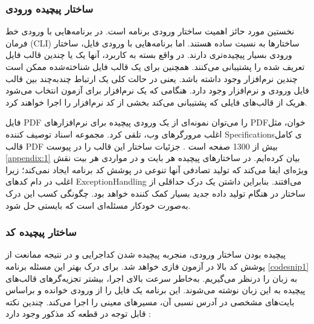 \subsubsection{ساختار پیچیده ورودی}
نخستین مورد حائز اهمیت ساختار ورودی برنامه است. در برنامه‌هایی با ورودی خط فرمان (\gls{CLI}) ساختارها به نسبت ساده هستند. اما برنامه‌هایی با ورودی فایل، ساختار ورودی بسیار پیچیده‌تری دارند. در واقع بسته به کاربرد، آنها یک یا چندین قالب فایل تعریف شده را پشتیبانی می‌کنند. همچنین برای یک قالب فایل شناخته‌شده ممکن است چندین نرم‌افزار وجود داشته‌ باشد. یعنی در حالت کلی یک ارتباط چند‌به‌چند بین قالب فایل ورودی و نرم‌افزار
وجود دارد. هنگامی که یک نرم‌افزار برای آزمون انتخاب می‌شود هریک از قالب‌های فایلی که پشتیبانی ‌می‌کند بخشی از کد نرم‌افزار را اجرا خواهند کرد.

فایل \gls{PDF}
را می‌توان نمونه‌ای از یک ورودی پیچیده برای نرم‌افزارهای \gls{PDF}خوان، مثل اغلب مرورگرهای وب،  تلقی کرد. مجموعه اسناد توصیف کننده \glspl{Specification}ی کامل قالب \gls{PDF} بیش از 1300 صفحه است 
\cite{Godefroid:2017:LML:3155562.3155573}.
 جزئیات ساختار این قالب را در پیوست \ref{appendix:1} بیان کرده‌ایم. در ساختارهای پیچیده هر بایت و در مواردی هر بیت نقش ویژه‌ای ایفا می‌کند که تولید تصادفی آنها تنوعی در پوشش کد برنامه ایجاد نمی‌کند؛ زیرا اغلب در دام کدهای \gls{ExceptionHandling} می‌افتند. بنابراین داشتن یک درک حداقلی از ساختار در هنگام تولید داده جدید بسیار کمک کننده خواهد بود. چگونگی کسب این درک به‌صورت خودکار مسئله‌ای است که بایستی حل شود.



\subsubsection{ساختار پیچیده کد}
پیچیده بودن ساختار ورودی، منجربه پیچیده شدن کداجرایی و در نتیجه ممانعت از پوشش کد بالا در آزمون فازی خواهد شد. برای درک بهتر این مسئله برنامه 
\ref{codesnip1}
به زبان  را درنظر می‌گیریم. به‌خاطر سرعت بالای اجرا، بیشتر تجزیه‌گرهای قالب‌های پیچیده به این زبان نوشته می‌شوند. این برنامه یک فایل را از ورودی خوانده و براساس بایت‌های مشخصی در آدرس نسبی آن، مسیرهای معینی را اجرا می‌کند. چندین نکته قابل توجه در قطعه کد مذکور وجود دارد
\cite{Rawat2017VUzzerAE}
:


